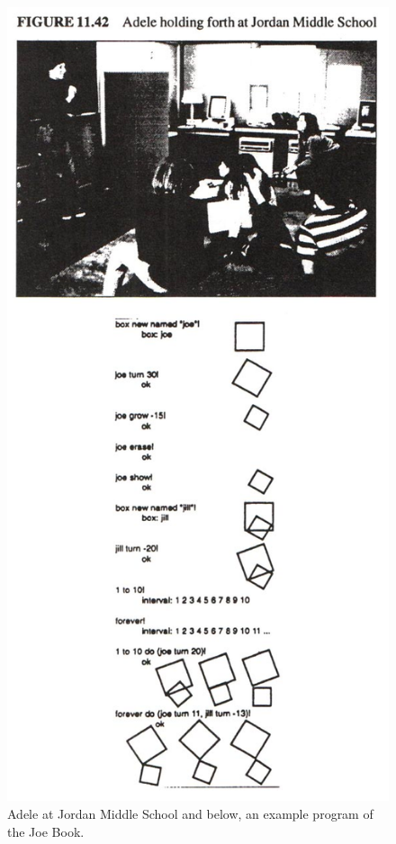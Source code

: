 \documentclass[letterpaper,12pt,parskip=full]{article}
\begin{document}
 \begin{figure}[ht]
        \centering \includegraphics[scale=0.55]{JOE_BOOK.jpg}
        \caption{
                \label{fig:joe_book}
                Adele at Jordan Middle School and below, an example program of the Joe Book.
        }
\end{figure}
\end{document}
